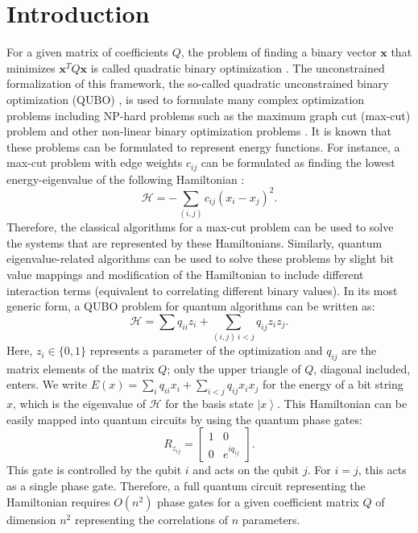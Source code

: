 \documentclass[onecolumn,10pt]{article}
\newcommand{\ket}[1]{\ensuremath{\left|#1\right\rangle}} %
\let\vec\mathbf
\theoremstyle{remark}
\theoremstyle{plain}
\begin{document}
\section{Introduction}


For a given matrix of coefficients $Q$, the problem of finding a binary vector $\vec{x}$ that minimizes $\mathbf{x}^T Q \mathbf{x}$ is called quadratic binary optimization \cite{brandao2022faster}. The unconstrained formalization of this framework, the so-called quadratic unconstrained binary optimization (QUBO) \cite{glover2022quantum}, is used to formulate many complex optimization problems including NP-hard problems such as the maximum graph cut (max-cut) problem \cite{dunning2018works} and other non-linear binary optimization problems \cite{anthony2017quadratic}. It is known that these problems can be formulated to represent energy functions. For instance, a max-cut problem with edge weights $c_{ij}$ can be formulated as finding the lowest energy-eigenvalue of the following Hamiltonian \cite{poljak1995solving,kolmogorov2004energy}:
\begin{equation}
 \mathcal{H} = -\sum_{(i,j)} c_{ij} (x_i - x_j)^2.
\end{equation}
Therefore, the classical algorithms for a max-cut problem can be used to solve the systems that are represented by these Hamiltonians. 
Similarly, quantum eigenvalue-related algorithms can be used to solve these problems by slight bit value mappings and modification of the Hamiltonian to include different interaction terms (equivalent to correlating different binary values). In its most generic form, a QUBO problem for quantum algorithms can be written as: 
\begin{equation}
    \mathcal{H}= \sum q_{ii}z_i + \sum_{(i,j)\ i< j} q_{ij} z_i z_j.
\end{equation}
Here, $z_i\in\{0,1\}$ represents a parameter of the optimization and $q_{ij}$ are the matrix elements of the matrix $Q$; only the upper triangle of $Q$, diagonal included, enters. We write $E(x)=\sum_iq_{ii}x_i+\sum_{i<j}q_{ij}x_ix_j$ for the energy of a bit string $x$, which is the eigenvalue of $\mathcal{H}$ for the basis state $\ket{x}$. This Hamiltonian can be easily mapped into quantum circuits by using the quantum phase gates:
 \begin{equation}
  R_{z_{ij}} =  \begin{bmatrix}
        1&0\\
        0&e^{iq_{ij}}
    \end{bmatrix}.
\end{equation}
This gate is controlled by the qubit $i$ and acts on the qubit $j$. For $i=j$, this acts as a single phase gate. Therefore, a full quantum circuit representing the Hamiltonian requires $O(n^2)$ phase gates for a given coefficient matrix $Q$ of dimension $n^2$ representing the correlations of $n$ parameters.
\end{document}
